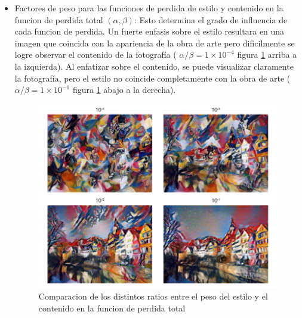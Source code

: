 \documentclass[a4paper,11pt,spanish]{book}
\begin{document}
\begin{itemize}
	 \item Factores de peso para las funciones de perdida de estilo y contenido en la funcion de perdida total $(\alpha, \beta)$: Esto determina el grado de influencia
	  de cada funcion de perdida. 
	  Un fuerte enfasis sobre el estilo resultara en una imagen que coincida con la apariencia de la obra de arte pero dificilmente se logre observar el contenido de la fotografía 
	  ( $\alpha / \beta = 1 \times 10^{-4}$ figura \ref{fig:ratio_content_style} arriba a la izquierda). Al enfatizar sobre el contenido, se puede visualizar claramente la fotografía,
	  pero el estilo no coincide completamente con la obra de arte ( $\alpha / \beta = 1 \times 10^{-1}$ figura \ref{fig:ratio_content_style} abajo a la derecha).
	  \begin{figure}[h]
	    \includegraphics[width=\textwidth]{./img/ratio_content_style.png}
	    \caption{Comparacion de los distintos ratios entre el peso del estilo y el contenido en la funcion de perdida total}
	    \label{fig:ratio_content_style}
	 \end{figure}
	 

\end{itemize}
\end{document}
